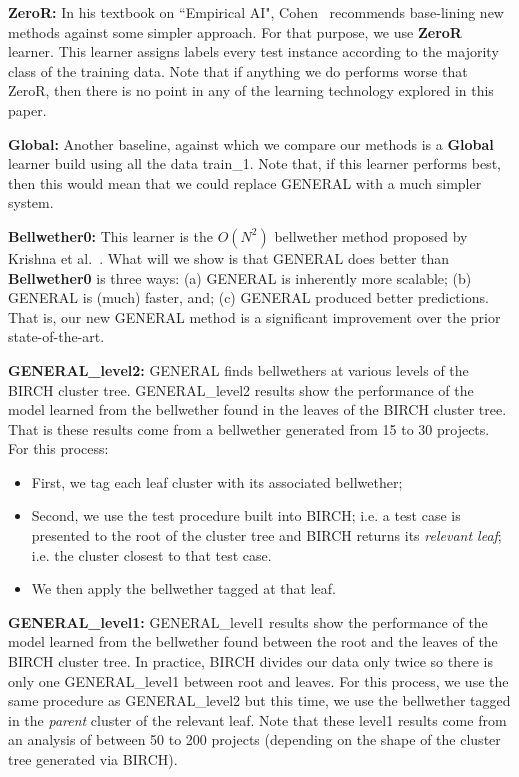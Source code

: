 \documentclass[10pt,journal,compsoc]{IEEEtran}
\newcommand{\bi}{\begin{itemize}}
\newcommand{\ei}{\end{itemize}}
\begin{document}
\textbf{ZeroR:} 
In his textbook on ``Empirical AI", Cohen~\cite{Cohen:1995} recommends base-lining new methods against some simpler approach.
For that purpose, we use {\bf ZeroR} learner. This learner assigns labels every test instance according to
the majority class of the training data. Note that if anything we do performs worse that ZeroR, then there is no
point in any of the learning technology explored in this paper.  

 
\textbf{Global:}  Another baseline, against which we compare our methods
is a {\bf Global} learner build using all the data   train\_1.
Note that, if this learner performs best, then this  would  mean that we could replace GENERAL with a much simpler system.


\textbf{Bellwether0:} This learner is the  $O(N^2)$ bellwether method  proposed by Krishna et al.~\cite{krishna16a}.
What will we show is that GENERAL does better than {\bf Bellwether0} is three ways:
(a) GENERAL is inherently more scalable; (b) GENERAL is (much) faster, and; (c) GENERAL produced better predictions.
That is, our new GENERAL method is a significant improvement over the prior state-of-the-art.


\textbf{GENERAL\_level2:}  GENERAL finds bellwethers at various levels of the BIRCH cluster tree.  GENERAL\_level2 results show the performance of the model learned from the bellwether found in the leaves of the  BIRCH cluster tree.
That is these results come from  a bellwether generated from 15 to 30 projects.  
For this process:
\bi
\item
First, we tag each leaf cluster with its associated bellwether;
\item
Second, we use the test procedure built into BIRCH; i.e. a test case is presented to the root
of the cluster tree and BIRCH returns its {\em relevant  leaf};
i.e. the cluster closest to that test case.
\item
We then apply the bellwether tagged at that leaf.
\ei
\textbf{GENERAL\_level1:}  GENERAL\_level1 results show the performance of the model learned from the bellwether found between the root and   the leaves of the  BIRCH cluster tree. In practice, BIRCH divides our data only twice
so there is only one GENERAL\_level1  between root and leaves. For this process,
we use the same procedure as GENERAL\_level2 but this time, we use the bellwether tagged in the {\em parent}
cluster of the relevant leaf. Note that these level1 results come from an analysis of between 50 to 200  projects
(depending on the shape of the cluster tree generated via BIRCH). 
\end{document}
